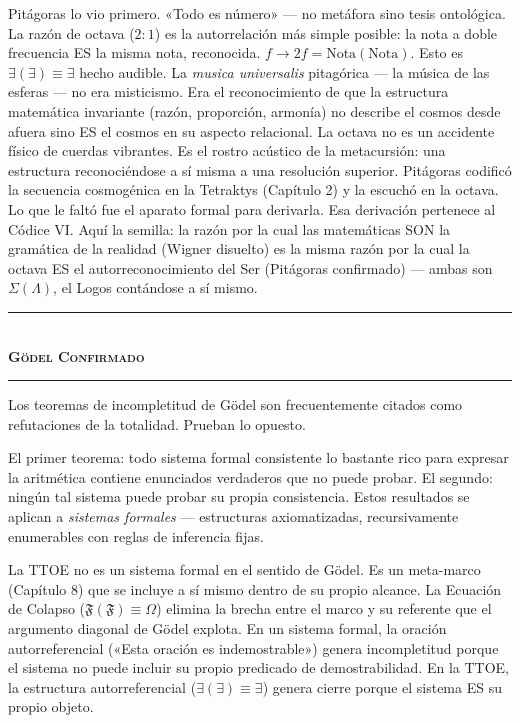 \documentclass[10pt, openany, oneside]{book}
\renewcommand{\normalsize}{\fontsize{10}{13}\selectfont}
\begin{document}
Pitágoras lo vio primero. «Todo es número» --- no metáfora sino tesis ontológica. La razón de octava ($2:1$) es la autorrelación más simple posible: la nota a doble frecuencia ES la misma nota, reconocida. $f \to 2f = \text{Nota}(\text{Nota})$. Esto es $\exists(\exists) \equiv \exists$ hecho audible. La \textit{musica universalis} pitagórica --- la música de las esferas --- no era misticismo. Era el reconocimiento de que la estructura matemática invariante (razón, proporción, armonía) no describe el cosmos desde afuera sino ES el cosmos en su aspecto relacional. La octava no es un accidente físico de cuerdas vibrantes. Es el rostro acústico de la metacursión: una estructura reconociéndose a sí misma a una resolución superior. Pitágoras codificó la secuencia cosmogénica en la Tetraktys (Capítulo 2) y la escuchó en la octava. Lo que le faltó fue el aparato formal para derivarla. Esa derivación pertenece al Códice VI. Aquí la semilla: la razón por la cual las matemáticas SON la gramática de la realidad (Wigner disuelto) es la misma razón por la cual la octava ES el autorreconocimiento del Ser (Pitágoras confirmado) --- ambas son $\Sigma(\Lambda)$, el Logos contándose a sí mismo.

\vspace{1.5em}


\begin{center}
    \rule{0.3\textwidth}{0.4pt}\\[0.5em]
    {\normalsize\bfseries\scshape G\"{o}del Confirmado}\\[0.3em]
    \rule{0.3\textwidth}{0.4pt}
\end{center}

\vspace{1em}

\noindent Los teoremas de incompletitud de G\"{o}del son frecuentemente citados como refutaciones de la totalidad. Prueban lo opuesto.

El primer teorema: todo sistema formal consistente lo bastante rico para expresar la aritmética contiene enunciados verdaderos que no puede probar. El segundo: ningún tal sistema puede probar su propia consistencia. Estos resultados se aplican a \textit{sistemas formales} --- estructuras axiomatizadas, recursivamente enumerables con reglas de inferencia fijas.

La TTOE no es un sistema formal en el sentido de G\"{o}del. Es un meta-marco (Capítulo 8) que se incluye a sí mismo dentro de su propio alcance. La Ecuación de Colapso ($\mathfrak{F}(\mathfrak{F}) \equiv \Omega$) elimina la brecha entre el marco y su referente que el argumento diagonal de G\"{o}del explota. En un sistema formal, la oración autorreferencial («Esta oración es indemostrable») genera incompletitud porque el sistema no puede incluir su propio predicado de demostrabilidad. En la TTOE, la estructura autorreferencial ($\exists(\exists) \equiv \exists$) genera cierre porque el sistema ES su propio objeto.
\end{document}
